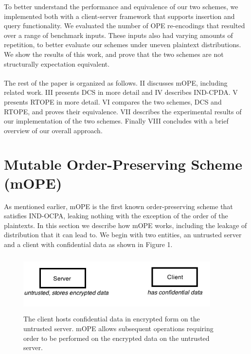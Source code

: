 \documentclass[12pt]{article}
\begin{document}
To better understand the performance and equivalence of our two schemes, we implemented both with a client-server framework that supports insertion and query functionality. We evaluated the number of OPE re-encodings that resulted over a range of benchmark inputs. These inputs also had varying amounts of repetition, to better evaluate our schemes under uneven plaintext distributions. We show the results of this work, and prove that the two schemes are not structurally expectation equivalent. \\ \\
The rest of the paper is organized as follows. II discusses mOPE, including related work. III presents DCS in more detail and IV describes IND-CPDA. V presents RTOPE in more detail. VI compares the two schemes, DCS and RTOPE, and proves their equivalence. VII describes the experimental results of our implementation of the two schemes. Finally VIII concludes with a brief overview of our overall approach. 
\section{Mutable Order-Preserving Scheme (mOPE)}
As mentioned earlier, mOPE is the first known order-preserving scheme that satisfies IND-OCPA, leaking nothing with the exception of the order of the plaintexts. In this section we describe how mOPE works, including the leakage of distribution that it can lead to. We begin with two entities, 
an untrusted server and a client with confidential data as shown in Figure 1. 
\begin{figure}[htb]
\begin{center}
\includegraphics[height=1.2in,width=4in,angle=0]{857pic4.png}
\caption{The client hosts confidential data in encrypted form on the untrusted server. mOPE allows subsequent operations requiring order to be performed on the encrypted data on the untrusted server.}
\end{center}
\end{figure}
\end{document}
